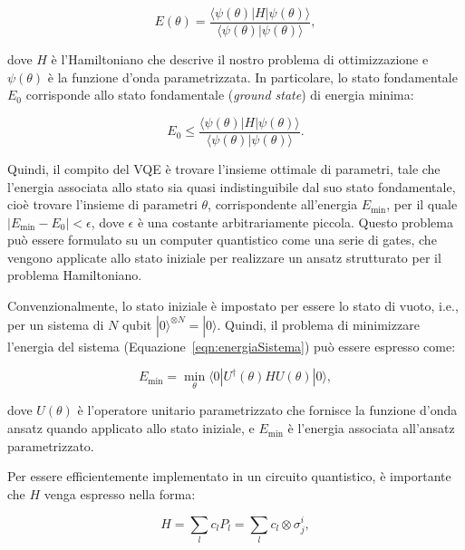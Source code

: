 \begin{equation}\label{eqn:energiaSistema}
    E(\theta) = \frac{
                    \langle\psi(\theta)|H|\psi(\theta)\rangle
                }
                {
                    \langle\psi(\theta)|\psi(\theta)\rangle
                },
\end{equation}

dove $H$ è l'Hamiltoniano che descrive il nostro problema di ottimizzazione e 
$\psi(\theta)$ è la funzione d'onda parametrizzata. In particolare, lo stato 
fondamentale $E_0$ corrisponde allo stato fondamentale (\textit{ground state}) 
di energia minima: 

\begin{equation}
    E_0 \le \frac{
                    \langle\psi(\theta)|H|\psi(\theta)\rangle
                }
                {
                    \langle\psi(\theta)|\psi(\theta)\rangle
                }.
\end{equation}

Quindi, il compito del VQE è trovare l'insieme ottimale di parametri, tale che 
l'energia associata allo stato sia quasi indistinguibile dal suo stato fondamentale, 
cioè trovare l'insieme di parametri $\theta$, corrispondente all'energia $E_{\min}$, 
per il quale $|E_{\min} - E_0| < \epsilon$, dove $\epsilon$ è una costante 
arbitrariamente piccola. Questo problema può essere formulato su un computer 
quantistico come una serie di gates, che vengono applicate allo stato iniziale 
per realizzare un ansatz strutturato per il problema Hamiltoniano. 

Convenzionalmente, lo stato iniziale è impostato per essere lo stato di vuoto, i.e., 
per un sistema di $N$ qubit $|0\rangle^{\otimes N} = |0\rangle$. 
Quindi, il problema di minimizzare l'energia del sistema (Equazione~\ref{eqn:energiaSistema}) 
può essere espresso come:

\begin{equation}
    E_{\min} = \min_{\theta} \langle 0|U^{\dagger}(\theta)HU(\theta)|0\rangle,
\end{equation}

dove $U(\theta)$ è l'operatore unitario parametrizzato che fornisce la funzione 
d'onda ansatz quando applicato allo stato iniziale, e $E_{\min}$ è l'energia 
associata all'ansatz parametrizzato.

Per essere efficientemente implementato in un circuito quantistico, è importante
che $H$ venga espresso nella forma:

\begin{equation}
    H = \sum_{l} c_l P_l = \sum_{l} c_l \otimes \sigma_j^i,
\end{equation}

